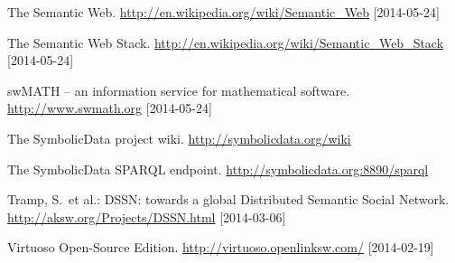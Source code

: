 \documentclass{llncs}
\newcommand{\SD}{{\sc Symbolic\-Data}}
\begin{document}
\begin{thebibliography}{1}
 The Semantic Web.
  \url{http://en.wikipedia.org/wiki/Semantic_Web} [2014-05-24]

 The Semantic Web Stack.
  \url{http://en.wikipedia.org/wiki/Semantic_Web_Stack} [2014-05-24]

 swMATH -- an information service for mathematical software.
  \url{http://www.swmath.org} [2014-05-24]

 The {\SD} project wiki.  \url{http://symbolicdata.org/wiki}

 The {\SD} SPARQL endpoint.
  \url{http://symbolicdata.org:8890/sparql}

 Tramp, S.\ et al.: DSSN: towards a global Distributed Semantic
  Social Network.  \url{http://aksw.org/Projects/DSSN.html} [2014-03-06]

 Virtuoso Open-Source Edition. \newblock
  \url{http://virtuoso.openlinksw.com/} [2014-02-19]

\end{thebibliography}
\end{document}
